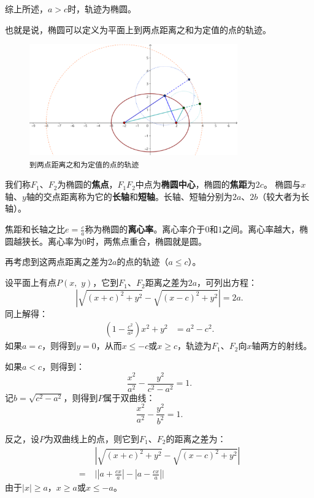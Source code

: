 \documentclass[12pt,UTF8]{ctexbook}
\begin{document}
综上所述，$a>c$时，轨迹为椭圆。

也就是说，椭圆可以定义为平面上到两点距离之和为定值的点的轨迹。

\begin{figure}[h] 
    \centering
    \includegraphics[width=0.8\textwidth]{tu/椭圆第一定义.png}
    \caption*{\texttt{到两点距离之和为定值的点的轨迹}}
\end{figure}

我们称$F_1$、$F_2$为椭圆的\textbf{焦点}，$F_1F_2$中点为\textbf{椭圆中心}，椭圆的\textbf{焦距}为$2c$。
椭圆与$x$轴、$y$轴的交点距离称为它的\textbf{长轴}和\textbf{短轴}。长轴、短轴分别为$2a$、$2b$（较大者为长轴）。

焦距和长轴之比$\displaystyle e =\frac{c}{a}$称为椭圆的\textbf{离心率}。离心率介于$0$和$1$之间。离心率越大，椭圆越狭长。离心率为$0$时，两焦点重合，椭圆就是圆。

再考虑到这两点距离之差为$2a$的点的轨迹（$a\leqslant c$）。

设平面上有点$P(x, \,\,y)$，它到$F_1$、$F_2$距离之差为$2a$，可列出方程：
$$ \left|\sqrt{(x + c)^2 + y^2} - \sqrt{(x - c)^2 + y^2}\right| = 2a.$$
同上解得：
\begin{align*}
    \left(1 - \frac{c^2}{a^2}\right)x^2 + y^2 &= a^2 - c^2.
\end{align*}
如果$a = c$，则得到$y = 0$，从而$x \leqslant -c$或$x \geqslant c$，轨迹为$F_1$、$F_2$向$x$轴两方的射线。

如果$a < c$，则得到：
$$ \frac{x^2}{a^2} - \frac{y^2}{c^2 - a^2} = 1.$$
记$b = \sqrt{c^2 - a^2}$，则得到$P$属于双曲线：
$$ \frac{x^2}{a^2} - \frac{y^2}{b^2} = 1.$$

反之，设$P$为双曲线上的点，则它到$F_1$、$F_2$的距离之差为：
\begin{align*}
    &\;\left|\sqrt{(x + c)^2 + y^2} - \sqrt{(x - c)^2 + y^2}\right|  \\
    =&\; \Bigg|\left|a + \frac{cx}{a}\right| - \left|a - \frac{cx}{a}\right|\Bigg|
\end{align*}
由于$|x| \geqslant a$，$x \geqslant a$或$x \leqslant -a$。
\end{document}
